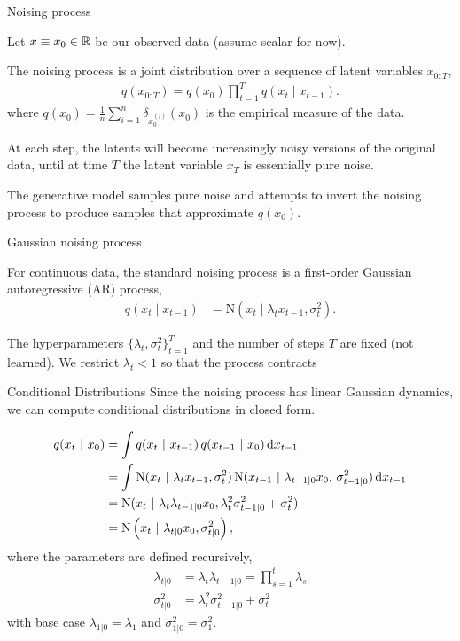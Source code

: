 \documentclass[aspectratio=169]{beamer}
\begin{document}
\begin{frame}[t,allowframebreaks]{Noising process}\label{noising-process}

Let \(x \equiv x_0 \in \mathbb{R}\) be our observed data (assume scalar for now).  

The noising process is a joint distribution over a sequence of latent variables $x_{0:T}$,
\begin{align*}
q(x_{0:T}) = q(x_0) \prod_{t=1}^T q(x_t \mid x_{t-1}).
\end{align*} 
where $q(x_0) = \frac{1}{n} \sum_{i=1}^n \delta_{x_0^{(i)}}(x_0)$ is the empirical measure of the data.

At each step, the latents will become increasingly noisy
versions of the original data, until at time \(T\) the latent variable
\(x_T\) is essentially pure noise. 

The generative model samples pure noise and attempts to invert the noising
process to produce samples that approximate $q(x_0)$.

\end{frame}

\begin{frame}[t,allowframebreaks]{Gaussian noising process}\label{gaussian-noising-process}

For continuous data, the standard noising process is a first-order
Gaussian autoregressive (AR) process, 
\begin{align*}
q(x_t \mid x_{t-1}) &= \mathrm{N}(x_t \mid \lambda_t x_{t-1}, \sigma_{t}^2).
\end{align*} 

The hyperparameters \(\{\lambda_t, \sigma_t^2\}_{t=1}^T\)
and the number of steps \(T\) are fixed (not learned). We restrict
\(\lambda_t < 1\) so that the process contracts

\end{frame}

\begin{frame}[t,allowframebreaks]{Conditional Distributions}
Since the noising process has linear Gaussian dynamics, we can compute
conditional distributions in closed form.

\begin{align*}
    q(x_{t} ~\vert~ x_0) 
    &= \int q(x_{t} ~\vert~ x_{t-1}) \, q(x_{t-1} ~\vert~ x_0) \mathop{}\!\mathrm{d} x_{t-1} \\
    &= \int \mathrm{N}(x_{t} ~\vert~ \lambda_{t} x_{t-1}, \sigma_{t}^2) \, \mathrm{N}(x_{t-1} ~\vert~ \lambda_{t-1|0} x_0, \, \sigma_{t-1|0}^2) \mathop{}\!\mathrm{d} x_{t-1} \\
    &= \mathrm{N}(x_{t} ~\vert~  \lambda_{t} \lambda_{t-1|0} x_0, \lambda_{t}^2 \sigma_{t-1|0}^2 + \sigma_{t}^2) \\
    &= \mathrm{N}\left( x_t ~\vert~ \lambda_{t|0} x_0, \sigma_{t|0}^2 \right),
\end{align*}
where the parameters are defined recursively,
\begin{align*}
\lambda_{t|0} &= \lambda_t \lambda_{t-1|0} = \prod_{s=1}^t \lambda_s \\
\sigma_{t|0}^2 &= \lambda_t^2 \sigma_{t-1|0}^2 + \sigma_t^2
\end{align*} 
with base case \(\lambda_{1|0}=\lambda_1\) and
\(\sigma_{1|0}^2=\sigma_1^2\).
\end{frame}
\end{document}
